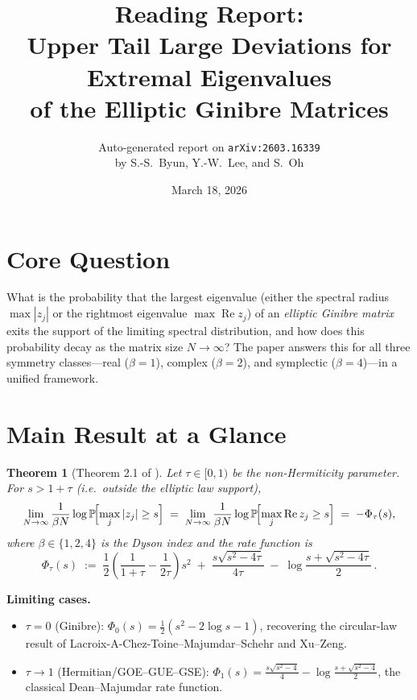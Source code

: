 \documentclass[11pt,a4paper]{article}
\title{Reading Report:\\Upper Tail Large Deviations for Extremal Eigenvalues\\of the Elliptic Ginibre Matrices}
\author{Auto-generated report on \texttt{arXiv:2603.16339}\\by S.-S.\ Byun, Y.-W.\ Lee, and S.\ Oh}
\date{March 18, 2026}
\newtheorem{theorem}{Theorem}
\theoremstyle{definition}
\theoremstyle{remark}
\begin{document}
\maketitle

\section{Core Question}

What is the probability that the largest eigenvalue (either the spectral radius $\max|z_j|$ or the rightmost eigenvalue $\max\operatorname{Re} z_j$) of an \emph{elliptic Ginibre matrix} exits the support of the limiting spectral distribution, and how does this probability decay as the matrix size $N\to\infty$?  The paper answers this for all three symmetry classes---real ($\beta=1$), complex ($\beta=2$), and symplectic ($\beta=4$)---in a unified framework.

\section{Main Result at a Glance}

\begin{theorem}[Theorem 2.1 of \cite{BLO26}]\label{thm:main}
Let $\tau\in[0,1)$ be the non-Hermiticity parameter.  For $s>1+\tau$ (i.e.\ outside the elliptic law support),
\[
\lim_{N\to\infty}\frac{1}{\beta N}\log\mathbb{P}\!\Bigl[\max_{j}|z_j|\ge s\Bigr]
\;=\;
\lim_{N\to\infty}\frac{1}{\beta N}\log\mathbb{P}\!\Bigl[\max_{j}\operatorname{Re} z_j\ge s\Bigr]
\;=\;-\Phi_\tau(s),
\]
where $\beta\in\{1,2,4\}$ is the Dyson index and the rate function is
\[
\Phi_\tau(s)\;:=\;\frac{1}{2}\!\left(\frac{1}{1+\tau}-\frac{1}{2\tau}\right)\!s^2
\;+\;\frac{s\sqrt{s^2-4\tau}}{4\tau}
\;-\;\log\frac{s+\sqrt{s^2-4\tau}}{2}\,.
\]
\end{theorem}

\noindent
\textbf{Limiting cases.}
\begin{itemize}[nosep]
\item $\tau=0$ (Ginibre): $\Phi_0(s)=\tfrac{1}{2}(s^2-2\log s-1)$, recovering the circular-law result of Lacroix-A-Chez-Toine--Majumdar--Schehr and Xu--Zeng.
\item $\tau\to 1$ (Hermitian/GOE--GUE--GSE): $\Phi_1(s)=\tfrac{s\sqrt{s^2-4}}{4}-\log\tfrac{s+\sqrt{s^2-4}}{2}$, the classical Dean--Majumdar rate function.
\end{itemize}
\end{document}
